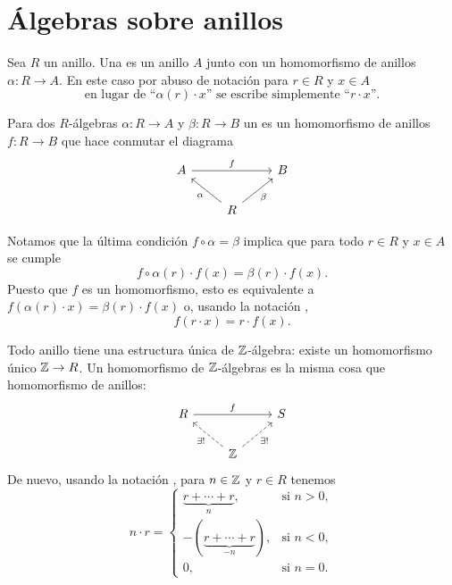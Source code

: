 
\section{Álgebras sobre anillos}

\begin{definicion}
  Sea $R$ un anillo. Una  es un anillo $A$
  junto con un homomorfismo de anillos $\alpha\colon R\to A$. En este caso por
  abuso de notación para $r\in R$ y $x\in A$
  \begin{equation}
    \label{eqn:abuso-de-notacion-para-algebras}
    \text{en lugar de ``}\alpha (r)\cdot x\text{'' se escribe simplemente ``}r\cdot x\text{''}.
  \end{equation}

  Para dos $R$-álgebras $\alpha\colon R\to A$ y $\beta\colon R\to B$
  un  es un homomorfismo
  de anillos $f\colon R\to B$ que hace conmutar el diagrama
  \[ \begin{tikzcd}
      A\ar{rr}{f} & & B \\
      & R\ar{ul}{\alpha}\ar{ur}[swap]{\beta}
    \end{tikzcd} \]
\end{definicion}

Notamos que la última condición $f\circ \alpha = \beta$ implica que para todo
$r\in R$ y $x\in A$ se cumple
$$f \circ \alpha (r)\cdot f (x) = \beta (r)\cdot f (x).$$
Puesto que $f$ es un homomorfismo, esto es equivalente
a $f (\alpha (r)\cdot x) = \beta (r)\cdot f (x)$ o, usando la notación
,
$$f (r\cdot x) = r\cdot f (x).$$

\begin{ejemplo}
  Todo anillo tiene una estructura única de $\mathbb{Z}$-álgebra: existe
  un homomorfismo único $\mathbb{Z} \to R$. Un homomorfismo de $\mathbb{Z}$-álgebras es
  la misma cosa que homomorfismo de anillos:
  \[ \begin{tikzcd}
      R\ar{rr}{f} & & S \\
      & \ZZ\ar[dashed]{ul}{\exists !}\ar[dashed]{ur}[swap]{\exists !}
    \end{tikzcd} \]
  De nuevo, usando la notación ,
  para $n\in \mathbb{Z}$ y $r\in R$ tenemos
  \[ n\cdot r = \begin{cases}
      \underbrace{r + \cdots + r}_n, & \text{si }n > 0,\\
      -(\underbrace{r + \cdots + r}_{-n}), & \text{si }n < 0,\\
      0, & \text{si }n = 0.
    \end{cases} \]
\end{ejemplo}

